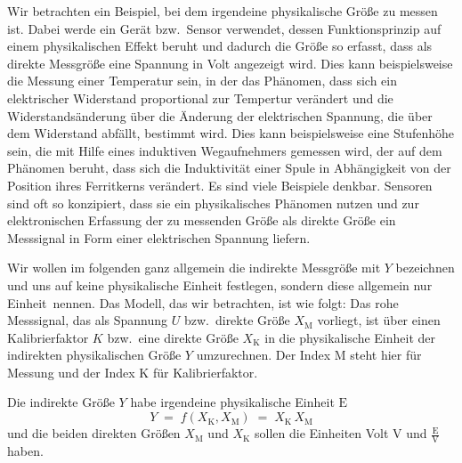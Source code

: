 Wir betrachten ein Beispiel, bei dem irgendeine physikalische Größe zu messen ist.
Dabei werde ein Gerät bzw.\ Sensor verwendet, dessen Funktionsprinzip auf einem
physikalischen Effekt beruht und dadurch die Größe so erfasst,
dass als direkte Messgröße eine Spannung in Volt angezeigt wird. Dies kann beispielsweise
die Messung einer Temperatur sein, in der das Phänomen, dass sich ein elektrischer
Widerstand proportional zur Tempertur verändert und die Widerstandsänderung über die
Änderung der elektrischen Spannung, die über dem Widerstand abfällt, bestimmt wird.
Dies kann beispielsweise eine Stufenhöhe sein, die mit Hilfe eines induktiven Wegaufnehmers
gemessen wird, der auf dem Phänomen beruht, dass sich die Induktivität einer Spule in Abhängigkeit
von der  Position ihres Ferritkerns verändert. Es sind viele Beispiele denkbar. Sensoren
sind oft so konzipiert, dass sie ein physikalisches Phänomen nutzen und zur elektronischen
Erfassung der zu messenden Größe als direkte Größe ein Messsignal in Form einer elektrischen
Spannung liefern.

Wir wollen im folgenden ganz allgemein die indirekte Messgröße mit $Y$
bezeichnen und uns auf keine physikalische Einheit festlegen, sondern diese allgemein nur
\glqq Einheit\grqq ~nennen. Das Modell, das wir betrachten, ist wie folgt: Das rohe Messsignal,
das als Spannung $U$ bzw.\ direkte Größe $X_\mathrm{M}$ vorliegt, ist über
einen Kalibrierfaktor $K$ bzw.\ eine direkte Größe $X_\mathrm{K}$
in die physikalische Einheit der indirekten physikalischen Größe $Y$ umzurechnen. 
Der Index M steht hier für Messung und der Index K für Kalibrierfaktor.

Die indirekte Größe $Y$ habe irgendeine physikalische Einheit $\mathrm{E}$
\begin{equation}
Y \; = \; f(X_\mathrm{K}, X_\mathrm{M})  \; = \; X_\mathrm{K} \, X_\mathrm{M}
\end{equation}
und die beiden direkten Größen $X_\mathrm{M}$ und $X_\mathrm{K}$ 
sollen die Einheiten Volt $\mathrm{V}$ und $\frac{\mathrm{E}}{\mathrm{V}}$
haben.


